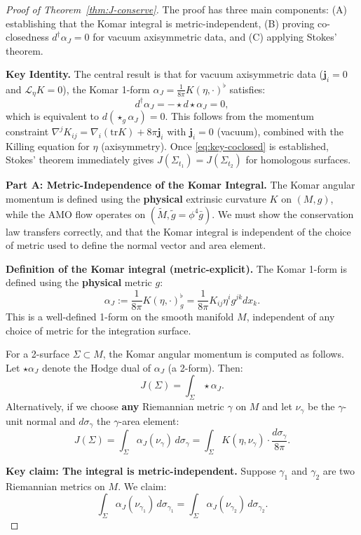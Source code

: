 \documentclass[10pt,a4paper]{amsart}
\newcommand{\bg}{\bar{g}}
\newcommand{\momdens}{\boldsymbol{j}}
\newcommand{\tM}{\tilde{M}}
\newcommand{\tg}{\tilde{g}}
\newcommand{\tr}{\mathrm{tr}}
\begin{document}
\begin{proof}[Proof of Theorem~\ref{thm:J-conserve}]
The proof has three main components: (A) establishing that the Komar integral is metric-independent, (B) proving co-closedness $d^\dagger\alpha_J = 0$ for vacuum axisymmetric data, and (C) applying Stokes' theorem.

\textbf{Key Identity.} The central result is that for vacuum axisymmetric data ($\momdens_i = 0$ and $\mathcal{L}_\eta K = 0$), the Komar 1-form $\alpha_J = \frac{1}{8\pi}K(\eta, \cdot)^\flat$ satisfies:
\begin{equation}\label{eq:key-coclosed}
d^\dagger \alpha_J = -\star d\star \alpha_J = 0,
\end{equation}
which is equivalent to $d(\star_g \alpha_J) = 0$. This follows from the momentum constraint $\nabla^j K_{ij} = \nabla_i(\tr K) + 8\pi \momdens_i$ with $\momdens_i = 0$ (vacuum), combined with the Killing equation for $\eta$ (axisymmetry). Once \eqref{eq:key-coclosed} is established, Stokes' theorem immediately gives $J(\Sigma_{t_1}) = J(\Sigma_{t_2})$ for homologous surfaces.

\textbf{Part A: Metric-Independence of the Komar Integral.}
The Komar angular momentum is defined using the \textbf{physical} extrinsic curvature $K$ on $(M, g)$, while the AMO flow operates on $(\tM, \tg = \phi^4 \bg)$. We must show the conservation law transfers correctly, and that the Komar integral is independent of the choice of metric used to define the normal vector and area element.

\textbf{Definition of the Komar integral (metric-explicit).} The Komar 1-form is defined using the \textbf{physical} metric $g$:
\[
\alpha_J := \frac{1}{8\pi} K(\eta, \cdot)^\flat_g = \frac{1}{8\pi} K_{ij} \eta^i g^{jk} dx_k.
\]
This is a well-defined 1-form on the smooth manifold $M$, independent of any choice of metric for the integration surface.

For a 2-surface $\Sigma \subset M$, the Komar angular momentum is computed as follows. Let $\star \alpha_J$ denote the Hodge dual of $\alpha_J$ (a 2-form). Then:
\[
J(\Sigma) = \int_\Sigma \star \alpha_J.
\]
Alternatively, if we choose \textbf{any} Riemannian metric $\gamma$ on $M$ and let $\nu_\gamma$ be the $\gamma$-unit normal and $d\sigma_\gamma$ the $\gamma$-area element:
\[
J(\Sigma) = \int_\Sigma \alpha_J(\nu_\gamma) \, d\sigma_\gamma = \int_\Sigma K(\eta, \nu_\gamma) \cdot \frac{d\sigma_\gamma}{8\pi}.
\]

\textbf{Key claim: The integral is metric-independent.} Suppose $\gamma_1$ and $\gamma_2$ are two Riemannian metrics on $M$. We claim:
\[
\int_\Sigma \alpha_J(\nu_{\gamma_1}) \, d\sigma_{\gamma_1} = \int_\Sigma \alpha_J(\nu_{\gamma_2}) \, d\sigma_{\gamma_2}.
\]


\end{proof}
\end{document}
